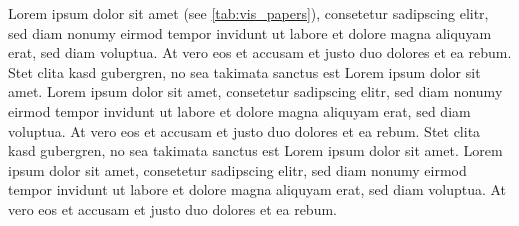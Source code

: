 \documentclass[journal]{vgtc}                %
\begin{document}
Lorem ipsum dolor sit amet (see \autoref{tab:vis_papers}), consetetur sadipscing elitr, sed diam
nonumy eirmod tempor invidunt ut labore et dolore magna aliquyam erat,
sed diam voluptua. At vero eos et accusam et justo duo dolores et ea
rebum. Stet clita kasd gubergren, no sea takimata sanctus est Lorem
ipsum dolor sit amet. Lorem ipsum dolor sit amet, consetetur
sadipscing elitr, sed diam nonumy eirmod tempor invidunt ut labore et
dolore magna aliquyam erat, sed diam voluptua. At vero eos et accusam
et justo duo dolores et ea rebum. Stet clita kasd gubergren, no sea
takimata sanctus est Lorem ipsum dolor sit amet. Lorem ipsum dolor sit
amet, consetetur sadipscing elitr, sed diam nonumy eirmod tempor
invidunt ut labore et dolore magna aliquyam erat, sed diam
voluptua. At vero eos et accusam et justo duo dolores et ea
rebum. 
\end{document}
